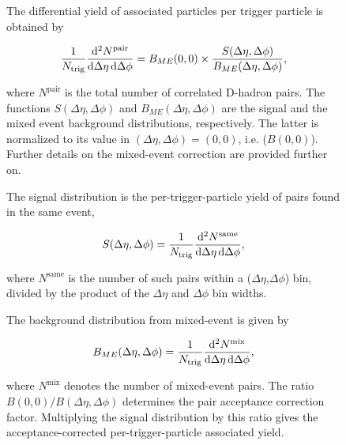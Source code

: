 \begin{enumerate}
\begin{figure}
\begin{enumerate}
The differential yield of associated particles per trigger particle is obtained by
\begin{linenomath}
  \begin{equation}
    \label{2pcorr_incl}
    \frac{1}{N_\text{trig}}\frac{\mathrm{d}^{2}N^\text{pair}}{\mathrm{d}\Delta\eta\, \mathrm{d}\Delta\phi}
= B_{ME}(0,0)\times\frac{S(\Delta\eta,\Delta\phi)}{B_{ME}(\Delta\eta,\Delta\phi)},
\end{equation}
\end{linenomath}
where $N^\text{pair}$ is the total number of correlated D-hadron
pairs. The functions $S(\Delta\eta,\Delta\phi)$ and
$B_{ME}(\Delta\eta,\Delta\phi)$ are the signal and the mixed event
background distributions, respectively. The latter is normalized to its value in
$(\Delta\eta,\Delta\phi)=(0,0)$, i.e. ($B(0,0)$).
Further details on the mixed-event correction are provided further on.

The signal distribution is the per-trigger-particle yield of pairs found in the same event,
\begin{linenomath}
\begin{equation}
\label{eq:signal}
S(\Delta\eta,\Delta\phi) = \frac{1}{N_\text{trig}}\frac{\mathrm{d}^{2}N^\text{same}}{\mathrm{d}\Delta\eta\, \mathrm{d}\Delta\phi},
\end{equation}
\end{linenomath}
where $N^\text{same}$ is the number of such pairs within a ($\Delta\eta$,$\Delta\phi$) bin, divided by the product of the $\Delta\eta$ and $\Delta\phi$ bin widths.

The background distribution from mixed-event is given by
\begin{linenomath}
\begin{equation}
\label{eq:background}
B_{ME}(\Delta\eta,\Delta\phi) = \frac{1}{N_\text{trig}}\frac{\mathrm{d}^{2}N^\text{mix}}{\mathrm{d}\Delta\eta\, \mathrm{d}\Delta\phi},
\end{equation}
\end{linenomath}
where $N^\text{mix}$ denotes the number of
mixed-event pairs.
The ratio $B(0,0)/B(\Delta\eta,\Delta\phi)$
determines the pair acceptance correction
factor. Multiplying the signal distribution by this ratio
gives the acceptance-corrected per-trigger-particle associated
yield.


\end{enumerate}
\end{figure}
\end{enumerate}
